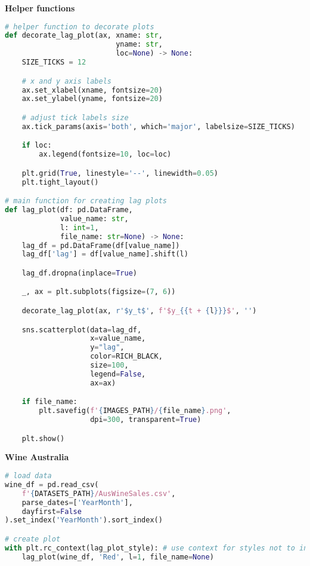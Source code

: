 {\noindent\hspace{-12.5pt}\normalsize\bfseries Helper functions}\vspace{-10pt}
\begin{center}
  \begin{lstlisting}[language=Python]
# helper function to decorate plots
def decorate_lag_plot(ax, xname: str, 
                          yname: str, 
                          loc=None) -> None:
    SIZE_TICKS = 12

    # x and y axis labels
    ax.set_xlabel(xname, fontsize=20)
    ax.set_ylabel(yname, fontsize=20)

    # adjust tick labels size
    ax.tick_params(axis='both', which='major', labelsize=SIZE_TICKS)

    if loc:
        ax.legend(fontsize=10, loc=loc)

    plt.grid(True, linestyle='--', linewidth=0.05)
    plt.tight_layout()

# main function for creating lag plots
def lag_plot(df: pd.DataFrame, 
             value_name: str, 
             l: int=1, 
             file_name: str=None) -> None:
    lag_df = pd.DataFrame(df[value_name])
    lag_df['lag'] = df[value_name].shift(l)

    lag_df.dropna(inplace=True)

    _, ax = plt.subplots(figsize=(7, 6))

    decorate_lag_plot(ax, r'$y_t$', f'$y_{{t + {l}}}$', '')

    sns.scatterplot(data=lag_df, 
                    x=value_name,
                    y="lag", 
                    color=RICH_BLACK, 
                    size=100, 
                    legend=False, 
                    ax=ax)

    if file_name:
        plt.savefig(f'{IMAGES_PATH}/{file_name}.png', 
                    dpi=300, transparent=True)

    plt.show()
  \end{lstlisting}
\end{center}


{\noindent\hspace{-12.5pt}\normalsize\bfseries Wine Australia}\vspace{-10pt}
\begin{center}
  \begin{lstlisting}[language=Python, 
  caption={График задержек продаж вина в Австралии.}, 
  label={lst:time_series_lag_plot_wine}]
# load data
wine_df = pd.read_csv(
    f'{DATASETS_PATH}/AusWineSales.csv',
    parse_dates=['YearMonth'],
    dayfirst=False
).set_index('YearMonth').sort_index()

# create plot
with plt.rc_context(lag_plot_style): # use context for styles not to interfere
    lag_plot(wine_df, 'Red', l=1, file_name=None)
  \end{lstlisting}
\end{center}

